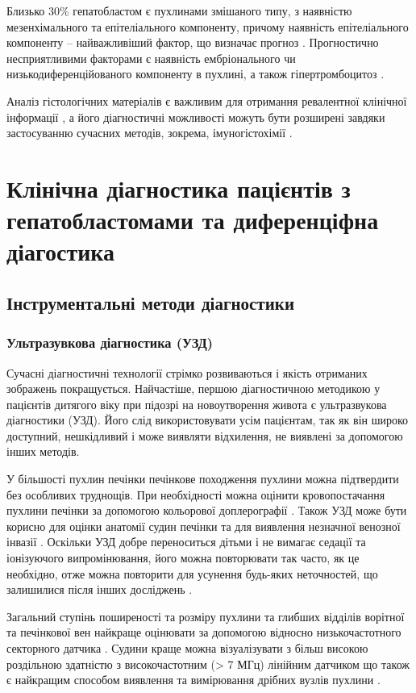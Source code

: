 Близько 30\% гепатобластом є пухлинами змішаного типу, з наявністю мезенхімального та епітеліального компоненту, причому наявність епітеліального компоненту –  найважливіший фактор, що визначає прогноз \cite{pmid11819207}. Прогностично несприятливими факторами є наявність ембріонального чи низькодиференційованого компоненту в пухлині, а також  гіпертромбоцитоз \cite{pmid11792985} \cite{pmid28620649}.

Аналіз гістологічних матеріалів є важливим для отримання ревалентної клінічної інформації \cite{pmid25783395}, а його діагностичні можливості можуть бути розширені завдяки застосуванню сучасних методів, зокрема, імуногістохімії \cite{pmid25945430}.  

\section{Клінічна діагностика пацієнтів з гепатобластомами та диференціфна діагостика}
\subsection{Інструментальні методи діагностики}
\subsubsection{Ультразувкова діагностика (УЗД)} 

Сучасні діагностичні технології стрімко розвиваються і якість отриманих зображень покращується. Найчастіше, першою діагностичною методикою у пацієнтів дитягого віку при підозрі на новоутворення живота є ультразвукова діагностики (УЗД). Його слід використовувати усім пацієнтам, так як він широко доступний, нешкідливий і може виявляти відхилення, не виявлені за допомогою інших методів.

У більшості пухлин печінки печінкове походження пухлини можна підтвердити без особливих труднощів. При необхідності можна оцінити кровопостачання пухлини печінки за допомогою кольорової доплерографії \cite{pmid22648963}. Також УЗД може бути корисно для оцінки анатомії судин печінки та для виявлення незначної венозної інвазії \cite{pmid16123986}. Оскільки УЗД добре переноситься дітьми і не вимагає седації та іонізуючого випромінювання, його можна повторювати так часто, як це необхідно, отже можна повторити для усунення будь-яких неточностей, що залишилися після інших досліджень \cite{pmid16176410}.

Загальний ступінь поширеності та розміру пухлини та глибших відділів ворітної та печінкової вен найкраще оцінювати за допомогою відносно низькочастотного секторного датчика \cite{pmid16185597}. Судини краще можна візуалізувати з більш високою роздільною здатністю з високочастотним (> 7 МГц) лінійним датчиком що також є найкращим способом виявлення та вимірювання дрібних вузлів пухлини \cite{pmid16404555}.
